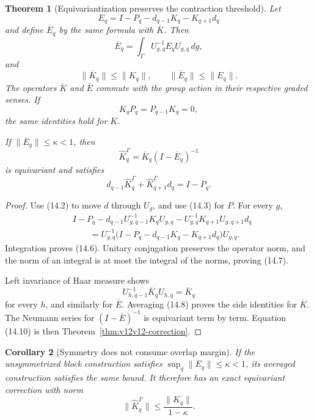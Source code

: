 \documentclass[11pt]{article}
\newtheorem{theorem}{Theorem}[section]
\newtheorem{corollary}[theorem]{Corollary}
\theoremstyle{remark}
\begin{document}
\begin{theorem}[Equivariantization preserves the contraction
threshold]
\label{thm:v12v14-average}
Let
\[
 E_q=I-P_q-d_{q-1}K_q-K_{q+1}d_q                           \tag{14.5}
\]
and define \(\overline E_q\) by the same formula with
\(\overline K\).  Then
\[
 \overline E_q
 =
 \int_\Gamma U_{g,q}^{-1}E_qU_{g,q}\,dg,                   \tag{14.6}
\]
and
\[
 \|\overline K_q\|\le\|K_q\|,
 \qquad
 \|\overline E_q\|\le\|E_q\|.                              \tag{14.7}
\]
The operators \(\overline K\) and \(\overline E\) commute with the
group action in their respective graded senses.  If
\[
 K_qP_q=P_{q-1}K_q=0,                                      \tag{14.8}
\]
the same identities hold for \(\overline K\).

If \(\|\overline E_q\|\le\kappa<1\), then
\[
 \widehat K_q^\Gamma
 =\overline K_q(I-\overline E_q)^{-1}                       \tag{14.9}
\]
is equivariant and satisfies
\[
 d_{q-1}\widehat K_q^\Gamma+
 \widehat K_{q+1}^\Gamma d_q=I-P_q.                         \tag{14.10}
\]
\end{theorem}

\begin{proof}
Use (14.2) to move \(d\) through \(U_g\), and use (14.3) for \(P\).
For every \(g\),
\[
\begin{split}
 &I-P_q-d_{q-1}
   U_{g,q-1}^{-1}K_qU_{g,q}
 -U_{g,q}^{-1}K_{q+1}U_{g,q+1}d_q\\
 &\qquad=U_{g,q}^{-1}
 \bigl(I-P_q-d_{q-1}K_q-K_{q+1}d_q\bigr)U_{g,q}.
\end{split}                                                  \tag{14.11}
\]
Integration proves (14.6).  Unitary conjugation preserves the
operator norm, and the norm of an integral is at most the integral
of the norms, proving (14.7).

Left invariance of Haar measure shows
\[
 U_{h,q-1}^{-1}\overline K_qU_{h,q}=\overline K_q           \tag{14.12}
\]
for every \(h\), and similarly for \(\overline E\).
Averaging (14.8) proves the side identities for \(\overline K\).
The Neumann series for
\((I-\overline E)^{-1}\) is equivariant term by term.
Equation (14.10) is then
Theorem~\ref{thm:v12v12-correction}.
\end{proof}

\begin{corollary}[Symmetry does not consume overlap margin]
\label{cor:v12v14-margin}
If the unsymmetrized block construction satisfies
\(\sup_q\|E_q\|\le\kappa<1\), its averaged construction satisfies
the same bound.  It therefore has an exact equivariant correction
with norm
\[
 \|\widehat K_q^\Gamma\|
 \le\frac{\|K_q\|}{1-\kappa}.                              \tag{14.13}
\]
\end{corollary}
\end{document}
